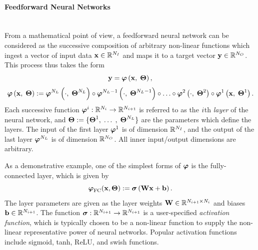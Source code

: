 \paragraph*{Feedforward Neural Networks}\mbox{}\\
%
From a mathematical point of view, a feedforward neural network can be considered as the successive composition of arbitrary non-linear functions which ingest a vector of input data $\nnInput \inROne{\numNNInput}$ and maps it to a target vector $\nnOutput \inROne{\numNNOutput}$. This process thus takes the form
%
\begin{equation}
	\nnOutput = \nnLayerFunc{\nnInput, \; \nnParams},
\end{equation}
\begin{equation}
	\nnLayerFunc{\nnInput, \; \nnParams} \defEq \nnLayerFuncIdx{\cdot, \; \nnParams^{\numLayers}}{\numLayers} \circ \nnLayerFuncIdx{\cdot, \; \nnParams^{\numLayers-1}}{\numLayers-1} \circ \hdots \circ \nnLayerFuncIdx{\cdot, \; \nnParams^{2}}{2} \circ \nnLayerFuncIdx{\nnInput, \; \nnParams^{1}}{1}.
\end{equation}
%
Each successive function $\funcMap{\nnLayerIdx{\dummyIdx}}{\ROne{N_{\dummyIdx}}}{\ROne{N_{\dummyIdx+1}}}$ is referred to as the $\dummyIdx$th \textit{layer} of the neural network, and $\nnParams \defEq \{\nnParams^{1}, \; \hdots \;, \; \nnParams^{\numLayers}\}$ are the parameters which define the layers. The input of the first layer $\nnLayer^1$ is of dimension $\ROne{\numNNInput}$, and the output of the last layer $\nnLayer^{\numLayers}$ is of dimension $\ROne{\numNNOutput}$. All inner input/output dimensions are arbitrary.

As a demonstrative example, one of the simplest forms of $\nnLayer$ is the fully-connected layer, which is given by
%
\begin{equation}
	\nnLayer_{\text{FC}}(\nnInput, \nnParams) \defEq \actFunc{\nnWeights \nnInput + \nnBias}.
\end{equation}
%
The layer parameters are given as the layer weights $\nnWeights \inRTwo{N_{\dummyIdx+1}}{N_{\dummyIdx}}$ and biases $\nnBias \inROne{N_{\dummyIdx+1}}$. The function $\funcMap{\nnAct}{\ROne{N_{\dummyIdx+1}}}{\ROne{N_{\dummyIdx+1}}}$ is a user-specified \textit{activation function}, which is typically chosen to be a non-linear function to supply the non-linear representative power of neural networks. Popular activation functions include sigmoid, tanh, ReLU, and swish functions.

